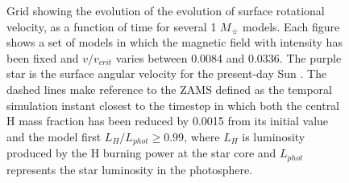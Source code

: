 \documentclass[fleqn,usenatbib]{mnras}
\begin{document}
\begin{figure}
\begin{subfigure}[h]{0.47\textwidth}
    \label{fig:subim46}
    \end{subfigure}
\caption{Grid showing the evolution of the evolution of surface rotational velocity, as a function of time for several 1 $M_{\sun}$ models. Each figure shows a set of models in which the magnetic field with intensity has been fixed and $v/v_{crit}$ varies between 0.0084 and 0.0336. The purple star is the surface angular velocity for the present-day Sun \citep{Gill2012}. The dashed lines make reference to the ZAMS defined as the temporal simulation instant closest to the timestep in which both the central H mass fraction has been reduced by 0.0015 from its initial value and the model first $L_H/L_{phot} \geq 0.99$, where $L_{H}$ is luminosity produced by the H burning power at the star core and $L_{phot}$ represents the star luminosity in the photosphere.}
\label{fig:image24}
\end{figure}
\end{document}

